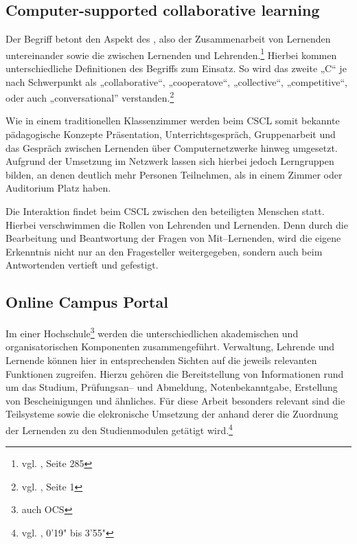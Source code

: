 \subsection{Computer-supported collaborative learning} %
\label{sub:cscl}
Der Begriff  betont den Aspekt des , also der Zusammenarbeit von Lernenden untereinander sowie die zwischen Lernenden und Lehrenden.\footnote{vgl. \cite{euler:boos}, Seite 285} Hierbei kommen unterschiedliche Definitionen des Begriffs zum Einsatz. So wird das zweite „C“ je nach Schwerpunkt als „collaborative“, „cooperatove“, „collective“, „competitive“, oder auch „conversational” verstanden.\footnote{vgl. \cite{csclcomp}, Seite 1} 

Wie in einem traditionellen Klassenzimmer werden beim \ac{CSCL} somit bekannte pädagogische Konzepte Präsentation, Unterrichtsgespräch, Gruppenarbeit und das Gespräch zwischen Lernenden über Computernetzwerke hinweg umgesetzt. Aufgrund der Umsetzung im Netzwerk lassen sich hierbei jedoch Lerngruppen bilden, an denen deutlich mehr Personen Teilnehmen, als in einem Zimmer oder Auditorium Platz haben.

Die Interaktion findet beim \ac{CSCL} zwischen den beteiligten Menschen statt. Hierbei verschwimmen die Rollen von Lehrenden und Lernenden. Denn durch die Bearbeitung und Beantwortung der Fragen von Mit–Lernenden, wird die eigene Erkenntnis nicht nur an den Fragesteller weitergegeben, sondern auch beim Antwortenden vertieft und gefestigt. 

\subsection{Online Campus Portal} %
\label{sub:online_campus_portal}
Im  einer Hochschule\footnote{auch \ac{OCS}} werden die unterschiedlichen akademischen und organisatorischen Komponenten zusammengeführt. Verwaltung, Lehrende und Lernende können hier in entsprechenden Sichten auf die jeweils relevanten Funktionen zugreifen. Hierzu gehören die Bereitstellung von Informationen rund um das Studium, Prüfungsan– und Abmeldung, Notenbekanntgabe, Erstellung von Bescheinigungen und ähnliches. Für diese Arbeit besonders relevant sind die Teilsysteme  sowie die elekronische Umsetzung der  anhand derer die Zuordnung der Lernenden zu den Studienmodulen getätigt wird.\footnote{vgl. \cite{akad:campus}, 0'19" bis 3'55"}

